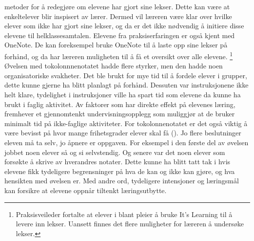 \documentclass[main.tex]{subfiles}
\begin{document}
metoder for å redegjøre om elevene har gjort sine lekser. Dette kan være at enkeltelever blir 
inspisert av lærer. Dermed vil læreren være klar over hvilke elever som ikke har gjort sine lekser, 
og da er det ikke nødvendig å initiere disse elevene til helklassesamtalen. Elevene fra 
praksiserfaringen er også kjent med OneNote. De kan foreksempel bruke OneNote til å laste opp 
sine lekser på forhånd, og da har læreren muligheten til å få et oversikt over alle elevene.
\footnote[4]{Praksisveileder fortalte at elever i blant pleier å bruke It's Learning til å levere
inn lekser. Uansett finnes det flere muligheter for læreren å undersøke lekser.}
\newline
\newline
Øvelsen med tokolonnnenotatet hadde flere styrker, men den hadde noen organisatoriske svakheter. 
Det ble brukt for mye tid til å fordele elever i grupper, dette kunne gjerne ha blitt planlagt på 
forhånd. Dessuten var instruksjonene ikke helt klare, tydelighet i instruksjoner ville ha spart tid 
som elevene da kunne ha brukt i faglig aktivitet. Av faktorer som har direkte effekt på elevenes 
læring, fremhever  et gjennomtenkt undervisningsopplegg som muliggjør at 
de bruker minimalt tid på ikke-faglige aktiviteter. For tokolonnenotatet er det også viktig å være 
bevisst på hvor mange frihetsgrader elever skal få (). Jo flere beslutninger eleven 
må ta selv, jo åpnere er oppgaven. For eksempel i den første del av øvelsen jobbet noen elever 
så og si selvstendig. Og senere var det noen elever som forsøkte å skrive av hverandres notater.
Dette kunne ha blitt tatt tak i hvis elevene fikk tydeligere begrensninger på hva de kan og ikke
kan gjøre, og hva hensikten med øvelsen er. Med andre ord, tydeligere intensjoner og læringsmål
kan forsikre at elevene oppnår tiltenkt læringsutbytte. 
\end{document}
